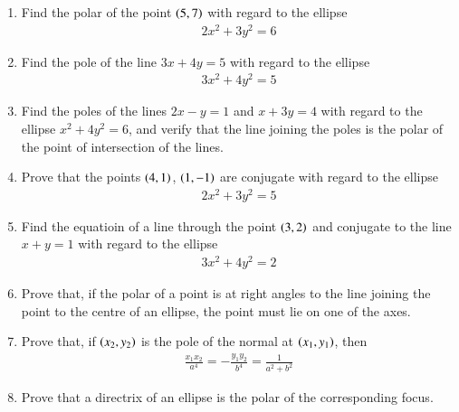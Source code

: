 \begin{enumerate}[1.]
\item Find the polar of the point $\left(5,7\right)$ with regard to the ellipse
\begin{align*}
2x^2+3y^2 = 6
\end{align*}
\item Find the pole of the line $3x+4y = 5$ with regard to the ellipse
\begin{align*}
3x^2+4y^2=5
\end{align*}
\item Find the poles of the lines $2x-y=1$ and $x+3y=4$ with regard to the ellipse $x^2+4y^2=6$, and verify that the line joining
the poles is the polar of the point of intersection of the lines.
\item Prove that the points $\left(4,1\right)$, $\left(1,-1\right)$ are conjugate with regard to the ellipse
\begin{align*}
2x^2+3y^2=5
\end{align*}
\item Find the equatioin of a line through the point $\left(3,2\right)$ and conjugate to the
line $x+y=1$ with regard to the ellipse
\begin{align*}
3x^2+4y^2 = 2
\end{align*}
\item Prove that, if the polar of a point is at right angles to the line joining the point  to
the centre of an ellipse, the point must lie on one of the axes.
\item Prove that, if $\left(x_2,y_2\right)$ is the pole of the normal at $\left(x_1,y_1\right)$, then
\begin{align*}
\frac{x_1x_2}{a^4}=-\frac{y_1y_2}{b^4}  = \frac{1}{a^2+b^2}
\end{align*}
\item Prove that a directrix of an ellipse is the polar of the corresponding focus.
\end{enumerate}